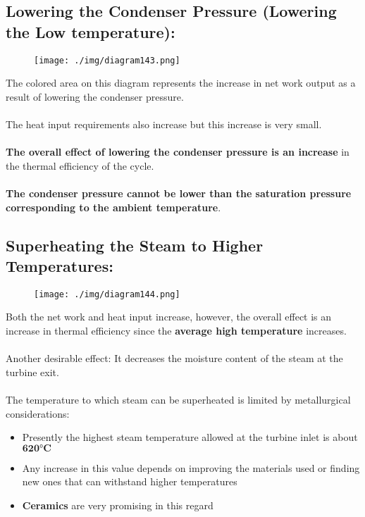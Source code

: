 \subsection*{Lowering the Condenser Pressure (Lowering the Low temperature):}
\begin{figure}[H]
  \centering
  \texttt{[image: ./img/diagram143.png]}
  \caption{}
\end{figure}
The colored area on this diagram represents the increase in net work output as a result of lowering the condenser pressure. \\\\
The heat input requirements also increase but this increase is very small. \\\\
\textbf{The overall effect of lowering the condenser pressure is an increase} in the thermal efficiency of the cycle. \\\\
\textbf{The condenser pressure cannot be lower than the saturation pressure corresponding to the ambient temperature}.
\subsection*{Superheating the Steam to Higher Temperatures:}
\begin{figure}[H]
  \centering
  \texttt{[image: ./img/diagram144.png]}
  \caption{}
\end{figure}
Both the net work and heat input increase, however, the overall effect is an increase in thermal efficiency since the \textbf{average high temperature} increases. \\\\
Another desirable effect: It decreases the moisture content of the steam at the turbine exit. \\\\
The temperature to which steam can be superheated is limited by metallurgical considerations:
\begin{itemize}[noitemsep]
  \item Presently the highest steam temperature allowed at the turbine inlet is about $\mathbf{620\si{\si\degree}C}$
  \item Any increase in this value depends on improving the materials used or finding new ones that can withstand higher temperatures
  \item \textbf{Ceramics} are very promising in this regard
\end{itemize}
